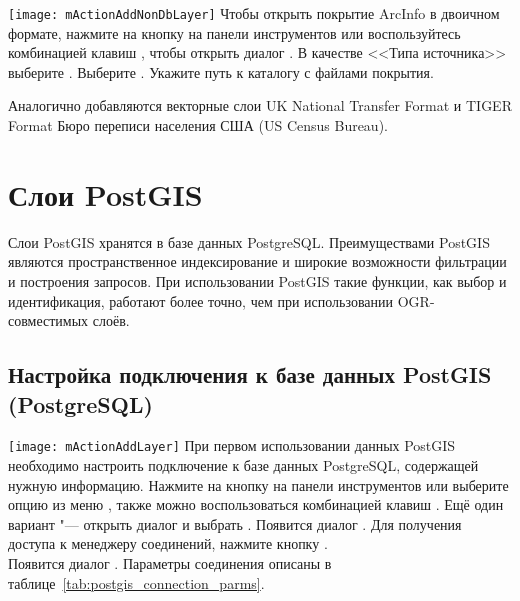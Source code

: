 \texttt{[image: mActionAddNonDbLayer]} Чтобы открыть покрытие ArcInfo
в двоичном формате, нажмите на кнопку
 на панели
инструментов или воспользуйтесь комбинацией клавиш ,
чтобы открыть диалог . В качестве
<<Типа источника>> выберите . Выберите
. Укажите путь к каталогу
с файлами покрытия.

Аналогично добавляются векторные слои UK National Transfer Format и
TIGER Format Бюро переписи населения США (US Census Bureau).

\section{Слои PostGIS}
\label{label_postgis}

Слои PostGIS хранятся в базе данных PostgreSQL. Преимуществами PostGIS
являются пространственное индексирование и широкие возможности
фильтрации и построения запросов. При использовании PostGIS такие функции,
как выбор и идентификация, работают более точно, чем при использовании
OGR-совместимых слоёв.

\subsection{Настройка подключения к базе данных PostGIS (PostgreSQL)}\label{sec:postgis_stored}

\texttt{[image: mActionAddLayer]} При первом использовании
данных PostGIS необходимо настроить подключение к базе данных PostgreSQL,
содержащей нужную информацию. Нажмите на кнопку
 на панели инструментов
или выберите опцию 
из меню , также можно воспользоваться комбинацией клавиш
. Ещё один вариант "--- открыть диалог
 и выбрать .
Появится диалог . Для получения доступа
к менеджеру соединений, нажмите кнопку
. \\
Появится диалог . Параметры соединения
описаны в таблице~\ref{tab:postgis_connection_parms}.

